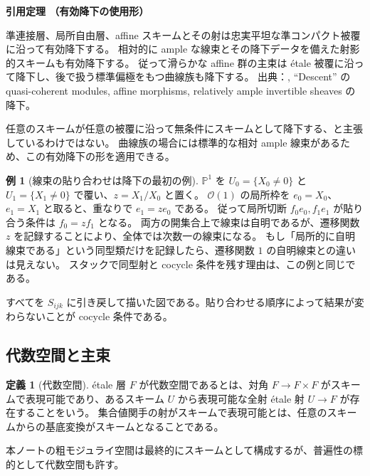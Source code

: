 \documentclass[dvipdfmx,a4paper,11pt]{article}
\theoremstyle{definition}
\newtheorem{dfn}[thm]{定義}
\newtheorem{exa}[thm]{例}
\newcommand{\PP}{\mathbb P}\newcommand{\HH}{\mathbb H}
\newcommand{\OO}{\mathcal O}\newcommand{\MM}{\mathcal M}\newcommand{\TT}{\mathcal T}
\newenvironment{external}[1]{\Needspace{7\baselineskip}\refstepcounter{thm}\begin{tcolorbox}[mybox,colback=blue!2,colframe=blue!40!black]\textbf{引用定理 \thethm（#1）}\par}{\end{tcolorbox}}
\begin{document}
\begin{external}{有効降下の使用形}\label{input:descent}
準連接層、局所自由層、affine スキームとその射は忠実平坦な準コンパクト被覆に沿って有効降下する。
相対的に ample な線束とその降下データを備えた射影的スキームも有効降下する。
従って滑らかな affine 群の主束は étale 被覆に沿って降下し、後で扱う標準偏極をもつ曲線族も降下する。
出典：\cite{Stacks}, ``Descent'' の quasi-coherent modules, affine morphisms, relatively ample invertible sheaves の降下。
\end{external}
任意のスキームが任意の被覆に沿って無条件にスキームとして降下する、と主張しているわけではない。
曲線族の場合には標準的な相対 ample 線束があるため、この有効降下の形を適用できる。

\begin{exa}[線束の貼り合わせは降下の最初の例]
$\PP^1$ を $U_0=\{X_0\neq0\}$ と $U_1=\{X_1\neq0\}$ で覆い、$z=X_1/X_0$ と置く。
$\OO(1)$ の局所枠を $e_0=X_0$、$e_1=X_1$ と取ると、重なりで $e_1=z e_0$ である。
従って局所切断 $f_0e_0,f_1e_1$ が貼り合う条件は $f_0=zf_1$ となる。
両方の開集合上で線束は自明であるが、遷移関数 $z$ を記録することにより、全体では次数一の線束になる。
もし「局所的に自明線束である」という同型類だけを記録したら、遷移関数 $1$ の自明線束との違いは見えない。
スタックで同型射と cocycle 条件を残す理由は、この例と同じである。
\end{exa}

\par\medskip
\noindent\begin{minipage}{\linewidth}
\begin{center}
\end{center}
すべてを $S_{ijk}$ に引き戻して描いた図である。貼り合わせる順序によって結果が変わらないことが cocycle 条件である。
\end{minipage}\par\medskip

\subsection{代数空間と主束}
\begin{dfn}[代数空間]
étale 層 $F$ が代数空間であるとは、対角 $F\to F\times F$ がスキームで表現可能であり、あるスキーム $U$ から表現可能な全射 étale 射 $U\to F$ が存在することをいう。
集合値関手の射がスキームで表現可能とは、任意のスキームからの基底変換がスキームとなることである。
\end{dfn}
本ノートの粗モジュライ空間は最終的にスキームとして構成するが、普遍性の標的として代数空間も許す。
\end{document}
